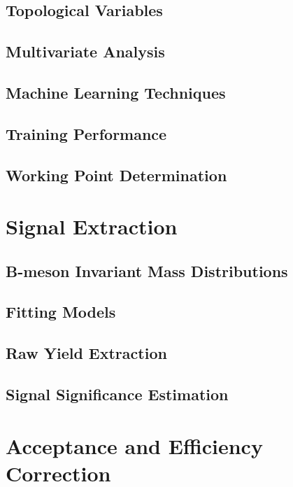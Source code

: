 \subsection{Topological Variables}

\subsection{Multivariate Analysis}

\subsection{Machine Learning Techniques}

\subsection{Training Performance}

\subsection{Working Point Determination}

\section{Signal Extraction} 

\subsection{B-meson Invariant Mass Distributions}

\subsection{Fitting Models}

\subsection{Raw Yield Extraction}

\subsection{Signal Significance Estimation}

\section{Acceptance and Efficiency Correction} 

